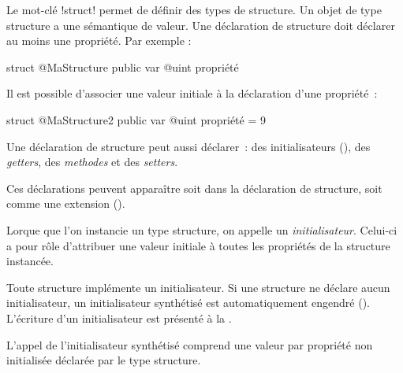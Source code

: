 




Le mot-clé \ggsq!struct! permet de définir des types de structure. Un objet de type structure a une sémantique de valeur. Une déclaration de structure doit déclarer au moins une propriété. Par exemple :

\begin{galgas34}
struct @MaStructure {
  public var @uint propriété
}
\end{galgas34}

Il est possible d'associer une valeur initiale à la déclaration d'une propriété~:
\begin{galgas34}
struct @MaStructure2 {
  public var @uint propriété = 9
}
\end{galgas34}

Une déclaration de structure peut aussi déclarer~: des initialisateurs (), des \emph{getters}, des \emph{methodes} et des \emph{setters}.

Ces déclarations peuvent apparaître soit dans la déclaration de structure, soit comme une extension ().













Lorque que l'on instancie un type structure, on appelle un \emph{initialisateur}. Celui-ci a pour rôle d'attribuer une valeur initiale à toutes les propriétés de la structure instancée.


Toute structure implémente un initialisateur. Si une structure ne déclare aucun initialisateur, un initialisateur synthétisé est automatiquement engendré (). L'écriture d'un initialisateur est présenté à la .


L'appel de l'initialisateur synthétisé comprend une valeur par propriété non initialisée déclarée par le type structure.

